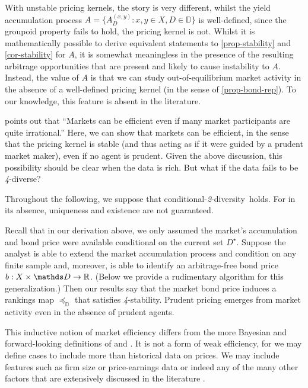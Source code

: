 \documentclass[12pt,a4paper,twoside]{article}
\newcommand{\mbbd}{{\mathds D}}
\newcommand{\past}{{D^\star}}
\newcommand{\xy}{{(x, y)}}
\newcommand{\stability}{\textit{4}-\textup{{stability}}}
\newcommand{\condtwodiv}{\textup{conditional-\textit{2}-diversity}}
\begin{document}
With unstable pricing kernels, the story is very different, whilst the yield
accumulation process $A = \{A^{\xy}_D : x, y \in X, D \in \mbbd\}$ is
well-defined, since the groupoid property fails to hold, the pricing kernel is
not. Whilst it is mathematically possible to derive equivalent statements to
\cref{prop-stability} and \cref{cor-stability} for $A$, it is somewhat
meaningless in the presence of the resulting arbitrage opportunities that are
present and likely to cause instability to $A$.  Instead, the value of $A$ is
that we can study out-of-equilibrium market activity in the absence of a
well-defined pricing kernel (in the sense of \cref{prop-bond-rep}). To our
knowledge, this feature is absent in the literature.


 points out that ``Markets can be
efficient even if many market participants are quite irrational.'' Here, we can
show that markets can be efficient, in the sense that the pricing kernel is
stable (and thus acting as if it were guided by a prudent market maker), even
if no agent is prudent. Given the above discussion, this possibility should be
clear when the data is rich.  But what if the data fails to be
\emph{4}-diverse?

Throughout the following, we suppose that \condtwodiv\ holds. For in its
absence, uniqueness and existence are not guaranteed.

Recall that in our derivation above, we only assumed the market's accumulation
and bond price were available conditional on the current set $\past$. Suppose
the analyst is able to extend the market accumulation process and condition on
any finite sample and, moreover, is able to identify an arbitrage-free bond
price $b: X \times \mbbd \rightarrow \R$. (Below we provide a rudimentary
algorithm for this {generalization}.) Then our results say that the market bond
price induces a rankings map $\preceq_{\mbbd}$ that satisfies \stability.
Prudent pricing emerges from market activity even in the absence of prudent
agents.

This inductive notion of market efficiency differs from the more Bayesian and
forward-looking definitions of \citet{Fama-market_efficiency} and
\citet{Malkiel-market_efficiency}. It is not a form of weak efficiency, for we
may define cases to include more than historical data on prices. We may include
features such as firm size or price-earnings data or indeed any of the many
other factors that are extensively discussed in the literature
\citep{Fama-Five-factor-model,HL-Lucky_factors,GKX-empirical_asset_pricing_via_ML}.
\end{document}
